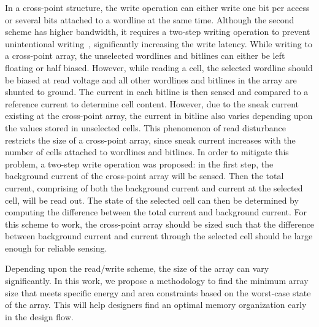 In a cross-point structure, the write operation can either write one bit per access or several bits attached to a wordline at the same time. Although the second scheme has higher bandwidth, it requires a two-step writing operation to prevent unintentional writing~\cite{memristor:Cong}, significantly increasing the write latency. %
While writing to a cross-point array, the unselected wordlines and bitlines can either be left floating or half biased. However, while reading a cell, the selected wordline should be biased at read voltage and all other wordlines and bitlines in the array are shunted to ground. The current in each bitline is then sensed and compared to a reference current to determine cell content. However, due to the sneak current existing at the cross-point array, the current in bitline also varies depending upon the values stored in unselected cells. %
 This phenomenon of read disturbance restricts the size of a cross-point array, since sneak current increases with the number of cells attached to wordlines and bitlines. In order to mitigate this problem, a two-step write operation was proposed: in the first step, the background current of the cross-point array  will be sensed. Then the total current, comprising of both the background current and current at the selected cell, will be read out. The state of the selected cell can then be determined by computing the difference between the total current and background current. For this scheme to work, the cross-point array should be sized such that the difference between background current
 and current through the selected cell should be large enough for reliable sensing.

Depending upon the read/write scheme, the size of the array can vary significantly. In this work, we propose a methodology to find the minimum array size that meets specific energy and area constraints based on the worst-case state of the array. This will help designers find an optimal memory organization early in the design flow. %


